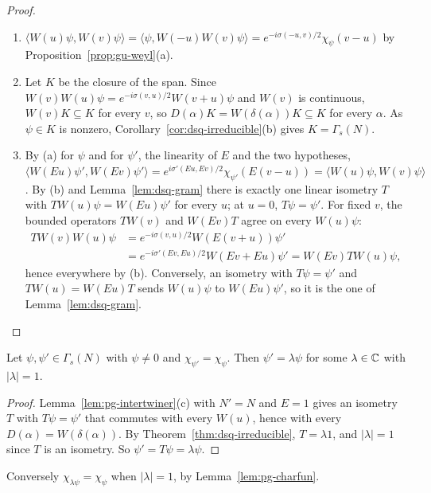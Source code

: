\begin{veteenv}
\begin{proof}
\begin{enumerate}
\item[(a)] $\langle W(u)\psi,W(v)\psi\rangle=\langle\psi,W(-u)W(v)\psi\rangle=e^{-i\sigma(-u,v)/2}\chi_\psi(v-u)$ by Proposition~\ref{prop:gu-weyl}(a).
\item[(b)] Let $K$ be the closure of the span. Since $W(v)W(u)\psi=e^{-i\sigma(v,u)/2}W(v+u)\psi$ and $W(v)$ is continuous, $W(v)K\subseteq K$ for
every $v$, so $D(\alpha)K=W(\delta(\alpha))K\subseteq K$ for every $\alpha$. As $\psi\in K$ is nonzero, Corollary~\ref{cor:dsq-irreducible}(b)
gives $K=\Gamma_s(N)$.
\item[(c)] By (a) for $\psi$ and for $\psi'$, the linearity of $E$ and the two hypotheses, $\langle W(Eu)\psi',W(Ev)\psi'\rangle=
e^{i\sigma'(Eu,Ev)/2}\chi_{\psi'}(E(v-u))=\langle W(u)\psi,W(v)\psi\rangle$. By (b) and Lemma~\ref{lem:dsq-gram} there is exactly one
linear isometry $T$ with $TW(u)\psi=W(Eu)\psi'$ for every $u$; at $u=0$, $T\psi=\psi'$. For fixed $v$, the bounded operators $TW(v)$ and
$W(Ev)T$ agree on every $W(u)\psi$:
\begin{align*}
 TW(v)W(u)\psi&=e^{-i\sigma(v,u)/2}W(E(v+u))\psi'\\
 &=e^{-i\sigma'(Ev,Eu)/2}W(Ev+Eu)\psi'=W(Ev)TW(u)\psi ,
\end{align*}
hence everywhere by (b). Conversely, an isometry with $T\psi=\psi'$ and $TW(u)=W(Eu)T$ sends $W(u)\psi$ to $W(Eu)\psi'$, so it is the
one of Lemma~\ref{lem:dsq-gram}.\qedhere
\end{enumerate}
\end{proof}

\begin{theorem}\label{thm:pg-phase}
Let $\psi,\psi'\in\Gamma_s(N)$ with $\psi\ne0$ and $\chi_{\psi'}=\chi_\psi$. Then $\psi'=\lambda\psi$ for some $\lambda\in\mathbb C$ with $\lvert\lambda\rvert=1$.
\end{theorem}

\begin{proof}
Lemma~\ref{lem:pg-intertwiner}(c) with $N'=N$ and $E=1$ gives an isometry $T$ with $T\psi=\psi'$ that commutes with every $W(u)$, hence
with every $D(\alpha)=W(\delta(\alpha))$. By Theorem~\ref{thm:dsq-irreducible}, $T=\lambda1$, and $\lvert\lambda\rvert=1$ since $T$ is an
isometry. So $\psi'=T\psi=\lambda\psi$.
\end{proof}

Conversely $\chi_{\lambda\psi}=\chi_\psi$ when $\lvert\lambda\rvert=1$, by Lemma~\ref{lem:pg-charfun}.


\end{veteenv}
